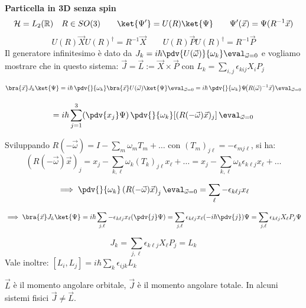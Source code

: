 \begin{example}
    \textbf{Particella in 3D senza spin}
    \[
        \mathcal{H} = L_2(\mathbb{R}) \quad R \in SO(3)\qquad
        \ket{\Psi' }= U(R)\ket{\Psi} \qquad \Psi'(\vec{x})= \Psi(R^{-1}\vec{x}) 
    \]
    \[
        U(R)\vec{X}U(R)^\dagger = R^{-1} \vec{X}    \qquad U(R)\vec{P}U(R)^\dagger = R^{-1}\vec{P}  
    \]
    Il generatore infinitesimo è dato da \(J_k = i\hbar  \pdv{U(\vec{\omega})}{\omega_k}\eval_{\vec{\omega}=0}\) 
    e vogliamo mostrare che in questo sistema: \(\vec{J}= \vec{L}:= \vec{X}\times \vec{P}\) con \( L_k = \sum_{i,j}\epsilon_{kij}X_i P_j\)

    \[
    \bra{\vec{x}}J_k\ket{\Psi}
    = i\hbar\,\pdv{}{\omega_k}\bra{\vec{x}}U(\vec{\omega})\ket{\Psi}\eval_{\vec{\omega}=0}
    = i\hbar\,\pdv{}{\omega_k}\Psi\!\big(R(\vec{\omega})^{-1}\vec{x}\big)\eval_{\vec{\omega}=0}
    \]

    \[
    = i\hbar\sum_{j=1}^{3}(\pdv{x_j}\Psi)\,\pdv{}{\omega_k}\!\left[(R(-\vec{\omega})\vec{x})_j\right]\eval_{\vec{\omega}=0}
    \]

    Sviluppando \(R(-\vec{\omega})=I-\sum_m\omega_mT_m+\dots\) con 
    \((T_m)_{j\ell}=-\epsilon_{m j \ell}\), si ha:
    \[
    (R(-\vec{\omega})\vec{x})_j = x_j - \sum_{k,\ell}\omega_k(T_k)_{j\ell}x_\ell+ \dots
    = x_j - \sum_{k,\ell}\omega_k\epsilon_{k \ell j}x_\ell + \dots
    \]

    \[
    \implies \pdv{}{\omega_k} \left(R(-\vec{\omega})\vec{x}\right)_j\eval_{\vec{\omega}=0}
    = \sum_{\ell}-\epsilon_{k  \ell j}x_\ell
    \]

    \[
    \implies \bra{\vec{x}}J_k\ket{\Psi}
    = i\hbar\sum_{j,\ell}-\epsilon_{k  \ell j}x_\ell(\pdv{j}\Psi)
    = \sum_{j,\ell}\epsilon_{k\ell j}x_\ell(-i\hbar\pdv{j})\Psi
    = \sum_{j,\ell}\epsilon_{k\ell j}X_\ell P_j\Psi
    \]

    \[
    \boxed{J_k = \sum_{j,\ell}\epsilon_{k\ell j}X_\ell P_j = L_k}
    \]
    Vale inoltre: \(\left[ L_i, L_j \right]= i\hbar \sum_k \epsilon_{ijk} L_k\)

    \begin{attention}
        \(\vec{L}\) è il momento angolare orbitale, \(\vec{J}\) è il momento angolare totale. In alcuni sistemi fisici \(\vec{J}\neq \vec{L}\).
    \end{attention}
\end{example}

